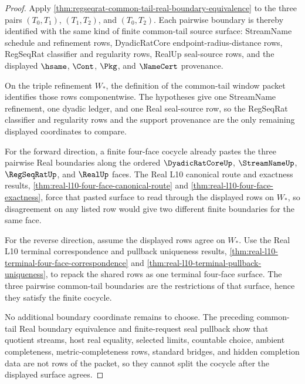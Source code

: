 \begin{proof}
Apply \autoref{thm:regseqrat-common-tail-real-boundary-equivalence} to the three pairs $(T_0,T_1)$, $(T_1,T_2)$, and $(T_0,T_2)$. Each pairwise boundary is thereby identified with the same kind of finite common-tail source surface: StreamName schedule and refinement rows, DyadicRatCore endpoint-radius-distance rows, RegSeqRat classifier and regularity rows, RealUp seal-source rows, and the displayed $\hsame$, $\Cont$, $\Pkg$, and $\NameCert$ provenance.

On the triple refinement $W_\ast$, the definition of the common-tail window packet identifies those rows componentwise. The hypotheses give one StreamName refinement, one dyadic ledger, and one Real seal-source row, so the RegSeqRat classifier and regularity rows and the support provenance are the only remaining displayed coordinates to compare.

For the forward direction, a finite four-face cocycle already pastes the three pairwise Real boundaries along the ordered $\DyadicRatCoreUp$, $\StreamNameUp$, $\RegSeqRatUp$, and $\RealUp$ faces. The Real L10 canonical route and exactness results, \autoref{thm:real-l10-four-face-canonical-route} and \autoref{thm:real-l10-four-face-exactness}, force that pasted surface to read through the displayed rows on $W_\ast$, so disagreement on any listed row would give two different finite boundaries for the same face.

For the reverse direction, assume the displayed rows agree on $W_\ast$. Use the Real L10 terminal correspondence and pullback uniqueness results, \autoref{thm:real-l10-terminal-four-face-correspondence} and \autoref{thm:real-l10-terminal-pullback-uniqueness}, to repack the shared rows as one terminal four-face surface. The three pairwise common-tail boundaries are the restrictions of that surface, hence they satisfy the finite cocycle.

No additional boundary coordinate remains to choose. The preceding common-tail Real boundary equivalence and finite-request seal pullback show that quotient streams, host real equality, selected limits, countable choice, ambient completeness, metric-completeness rows, standard bridges, and hidden completion data are not rows of the packet, so they cannot split the cocycle after the displayed surface agrees.
\end{proof}

